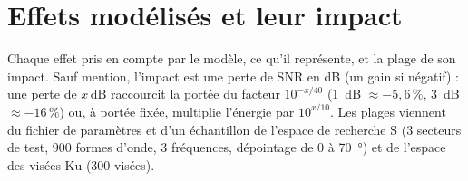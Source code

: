 \documentclass[11pt,a4paper]{article}
\newcommand{\dB}{\,\mathrm{dB}}
\begin{document}
\section{Effets modélisés et leur impact}\label{sec:effects}
Chaque effet pris en compte par le modèle, ce qu'il représente, et la plage de son impact. Sauf mention, l'impact est
une perte de SNR en dB (un gain si négatif) : une perte de $x\dB$ raccourcit la portée du facteur $10^{-x/40}$
(\SI{1}{dB} $\approx -5,6\,\%$, \SI{3}{dB} $\approx -16\,\%$) ou, à portée fixée, multiplie l'énergie par $10^{x/10}$.
Les plages viennent du fichier de paramètres et d'un échantillon de l'espace de recherche S (3 secteurs de test, 900
formes d'onde, 3 fréquences, dépointage de 0 à \SI{70}{\degree}) et de l'espace des visées Ku (300 visées).
\end{document}
